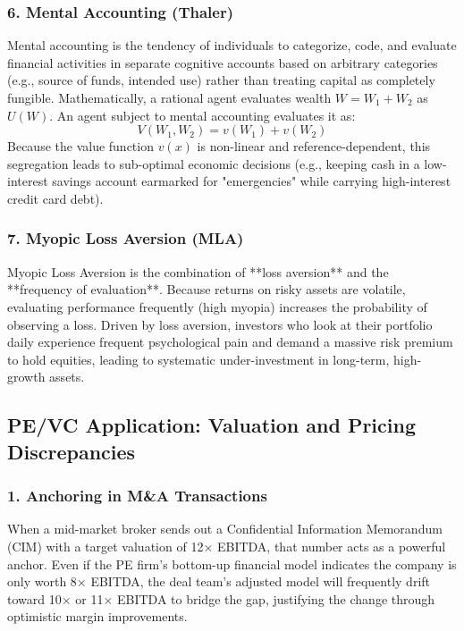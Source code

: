 \documentclass[11pt,a4paper]{article}
\begin{document}
\subsubsection{6. Mental Accounting (Thaler)}
Mental accounting is the tendency of individuals to categorize, code, and evaluate financial activities in separate cognitive accounts based on arbitrary categories (e.g., source of funds, intended use) rather than treating capital as completely fungible. 
Mathematically, a rational agent evaluates wealth $W = W_1 + W_2$ as $U(W)$. An agent subject to mental accounting evaluates it as:
\begin{equation}
    V(W_1, W_2) = v(W_1) + v(W_2)
\end{equation}
Because the value function $v(x)$ is non-linear and reference-dependent, this segregation leads to sub-optimal economic decisions (e.g., keeping cash in a low-interest savings account earmarked for "emergencies" while carrying high-interest credit card debt).

\subsubsection{7. Myopic Loss Aversion (MLA)}
Myopic Loss Aversion is the combination of **loss aversion** and the **frequency of evaluation**. Because returns on risky assets are volatile, evaluating performance frequently (high myopia) increases the probability of observing a loss. Driven by loss aversion, investors who look at their portfolio daily experience frequent psychological pain and demand a massive risk premium to hold equities, leading to systematic under-investment in long-term, high-growth assets.

\subsection{PE/VC Application: Valuation and Pricing Discrepancies}

\subsubsection{1. Anchoring in M\&A Transactions}
When a mid-market broker sends out a Confidential Information Memorandum (CIM) with a target valuation of 12$\times$ EBITDA, that number acts as a powerful anchor. Even if the PE firm's bottom-up financial model indicates the company is only worth 8$\times$ EBITDA, the deal team's adjusted model will frequently drift toward 10$\times$ or 11$\times$ EBITDA to bridge the gap, justifying the change through optimistic margin improvements.
\end{document}
